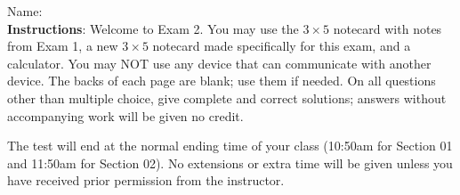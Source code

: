 \documentclass[addpoints]{exam}
\begin{document}
		
\vspace*{0pt}

\noindent
Name: \underline{\hspace{2in}} \\


\noindent
\textbf{Instructions}: Welcome to Exam 2. You may use the $3 \times 5$ notecard with notes from Exam 1, a new $3 \times 5$ notecard made specifically for this exam, and a calculator. You may NOT use any device that can communicate  with another device. The backs of each page are blank; use them if needed. On all questions other than multiple choice, give complete and correct solutions; answers without accompanying work will be given no credit. 

The test will end at the normal ending time of your class (10:50am for Section 01 and 11:50am for Section 02). No extensions or extra time will be given unless you have received prior permission from the instructor.
\end{document}
